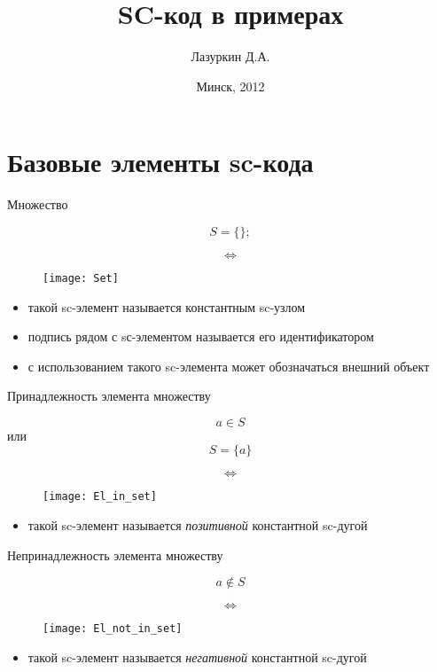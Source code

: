 \documentclass[hyperref={pdftex,unicode}]{beamer}
\newcommand{\objeqv}{
  \begin{center}
    \begin{sideways}
      \[ \Longleftrightarrow \]
    \end{sideways}
  \end{center}
}
\begin{document}
\title{SC-код в примерах}  
\author{Лазуркин Д.А.}
\date{Минск, 2012} 

\begin{frame}
  \maketitle{}
\end{frame}


\section{Базовые элементы sc-кода}
\begin{frame}{Множество}
  \begin{center}
    \[ S = \{ \}; \]

    \objeqv  

    \begin{figure}
      \texttt{[image: Set]}
    \end{figure}
  \end{center}

  \begin{itemize}
  \item такой sc-элемент называется константным sc-узлом
  \item подпись рядом с sс-элементом называется его идентификатором
  \item с использованием такого sc-элемента может обозначаться внешний
    объект
  \end{itemize}
\end{frame}


\begin{frame}{Принадлежность элемента множеству}
  \begin{center}
    \[ a \in S \] или \[ S = \{a\} \]

    \objeqv  

    \begin{figure}
      \texttt{[image: El\_in\_set]}
    \end{figure}
  \end{center}

  \begin{itemize}
  \item такой sc-элемент называется \emph{позитивной} константной sc-дугой
  \end{itemize}
\end{frame}

\begin{frame}{Непринадлежность элемента множеству}
  \begin{center}
    \[ a \notin S \]

    \objeqv  

    \begin{figure}
      \texttt{[image: El\_not\_in\_set]}
    \end{figure}
  \end{center}

  \begin{itemize}
  \item такой sc-элемент называется \emph{негативной} константной sc-дугой
  \end{itemize}
\end{frame}
\end{document}
